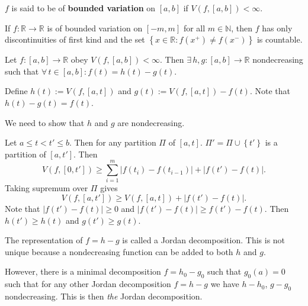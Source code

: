 \documentclass{notes}
\begin{document}
  \begin{defn}
    $f$ is said to be of {\boldmath \bfseries bounded variation} on $[a, b]$ if $V(f, [a, b]) < \infty$.
  \end{defn}
  
  \begin{lem}
    If $f \colon \mathbb R \to \mathbb R$ is of bounded variation on $[-m, m]$ for all $m \in \mathbb N$, then $f$ has only discontinuities of first kind and the set $\left \{ x \in \mathbb R : f(x^+) \neq f(x^-) \right \}$ is countable.
  \end{lem}
  
  \newpage
  
  \begin{thm}
    Let $f \colon [a, b] \to \mathbb R$ obey $V(f, [a, b]) < \infty$.
    Then $\exists \, h, g \colon [a, b] \to \mathbb R$ nondecreasing such that $\forall \, t \in [a, b]: f(t) = h(t) - g(t)$.
  \end{thm}
  
  \begin{prf}
    Define $h(t) := V(f, [a, t])$ and $g(t) := V(f, [a, t]) - f(t)$.
    Note that $h(t) - g(t) = f(t)$.

    We need to show that $h$ and $g$ are nondecreasing.
    
    Let $a \leq t < t' \leq b$.
    Then for any partition $\Pi$ of $[a, t]$.
    $\Pi' = \Pi \cup \left \{ t' \right \}$ is a partition of $[a, t']$.
    Then 
    \begin{equation}
      V(f, [0, t']) \geq \sum_{i = 1}^m \left | f(t_i) - f(t_{i - 1}) \right | + \left | f(t') - f(t) \right |.
    \end{equation}
    Taking supremum over $\Pi$ gives 
    \begin{equation}
      V(f, [a, t']) \geq V(f, [a, t]) + \left | f(t') - f(t) \right |.
    \end{equation}
    Note that $\left | f(t') - f(t) \right | \geq 0$ and $\left | f(t') - f(t) \right | \geq f(t') - f(t)$.
    Then $h(t') \geq h(t)$ and $g(t') \geq g(t)$.
  \end{prf}
  
  \strut
  
  The representation of $f = h - g$ is called a Jordan decomposition.
  This is not unique because a nondecreasing function can be added to both $h$ and $g$.
  
  However, there is a minimal decomposition $f = h_{0} - g_{0}$ such that $g_0(a) = 0$ such that for any other Jordan decomposition $f = h - g$ we have $h - h_0$, $g - g_0$ nondecreasing.
  This is then \textit{the} Jordan decomposition.
  
\end{document}
